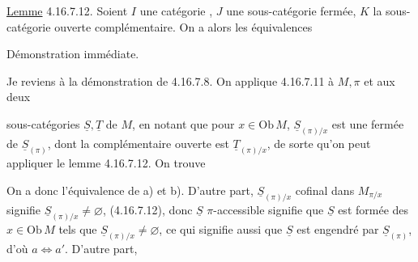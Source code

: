 \uline{Lemme} 4.16.7.12. Soient $I$ une catégorie , $J$ une sous-catégorie fermée, $K$ la sous-catégorie ouverte complémentaire. On a alors les équivalences


Démonstration immédiate.

Je reviens à la démonstration de 4.16.7.8. On applique    4.16.7.11  à $M,\pi$ et aux deux



sous-catégories $\underline S,\underline T$ de $M$, en notant que pour $x\in\mathrm{Ob}\,M$, $\underline S_{(\pi)/x}$ est une  fermée de $\underline S_{(\pi)}$, dont la complémentaire ouverte est $\underline T_{(\pi)/x}$, de sorte qu'on peut appliquer le lemme 4.16.7.12. On trouve


On a donc l'équivalence de a) et b). D'autre part, $\underline S_{(\pi)/x}$ cofinal dans $M_{\pi/x}$ signifie   $\underline S_{(\pi)/x}\ne\varnothing$,  (4.16.7.12), donc  $\underline S$ $\pi$-accessible signifie que $\underline S$ est formée des $x\in\mathrm{Ob}\,M$ tels que $\underline S_{(\pi)/x}\ne\varnothing$, ce qui signifie aussi que $\underline S$ est  engendré par $\underline S_{(\pi)}$, d'où $a\Longleftrightarrow a'$. D'autre part,

